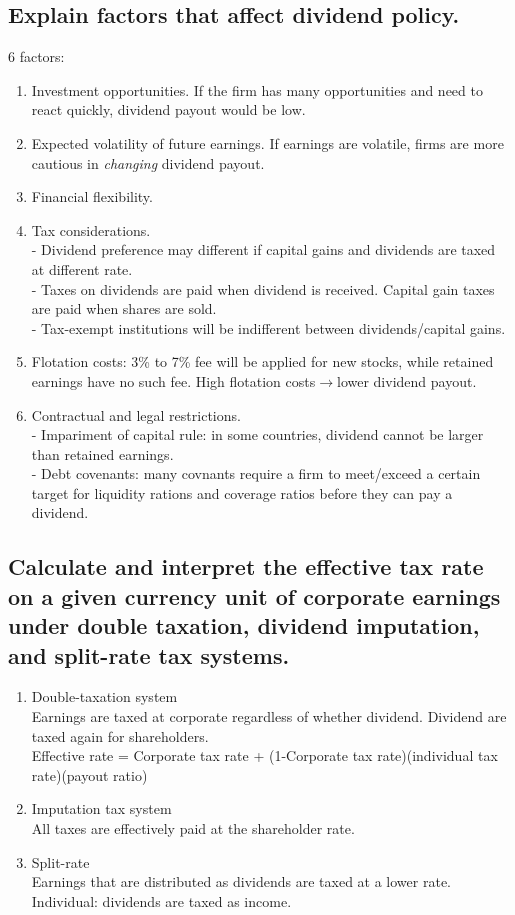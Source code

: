 \documentclass{article}
\newcommand{\be}{\begin{enumerate}}
\newcommand{\ee}{\end{enumerate}}
\newcommand{\ra}{$\rightarrow$}
\begin{document}
\subsection{Explain factors that affect dividend policy.}
6 factors:
\be
    \item Investment opportunities. If the firm has many opportunities and need
        to react quickly, dividend payout would be low.
    \item Expected volatility of future earnings. If earnings are volatile, firms
        are more cautious in {\it changing} dividend payout.
    \item Financial flexibility.
    \item Tax considerations.
        \\- Dividend preference may different if capital gains and dividends are taxed
        at different rate.
        \\- Taxes on dividends are paid when dividend is received. Capital gain taxes
        are paid when shares are sold.
        \\- Tax-exempt institutions will be indifferent between dividends/capital gains.
    \item Flotation costs: 3\% to 7\% fee will be applied for new stocks, while retained
        earnings have no such fee. High flotation costs\ra lower dividend payout.
    \item Contractual and legal restrictions.
        \\- Impariment of capital rule: in some countries, dividend cannot be larger
        than retained earnings.
        \\- Debt covenants: many covnants require a firm to meet/exceed a certain target
        for liquidity rations and coverage ratios before they can pay a dividend.
\ee
\subsection{Calculate and interpret the effective tax rate on a given currency unit of
corporate earnings under double taxation, dividend imputation, and split-rate tax systems.}
\be
    \item Double-taxation system
        \\ Earnings are taxed at corporate regardless of whether dividend. Dividend are taxed again
        for shareholders.
        \\ Effective rate = Corporate tax rate + (1-Corporate tax rate)(individual tax rate)(payout ratio)
    \item Imputation tax system
        \\ All taxes are effectively paid at the shareholder rate.
    \item Split-rate
        \\ Earnings that are distributed as dividends are taxed at a lower rate. Individual: dividends
        are taxed as income.
\ee
\end{document}
